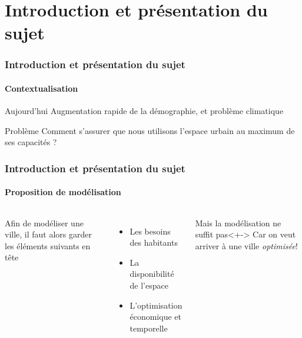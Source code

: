 \section[Intro]{Introduction et présentation du sujet}

\begin{frame}
	\frametitle{Introduction et présentation du sujet}
	\framesubtitle{Contextualisation}

	\begin{block}{Aujourd'hui}
		Augmentation rapide de la démographie, et problème climatique
	\end{block}

	\pause

	\begin{alertblock}{Problème}
		\pause
		Comment s'assurer que nous utilisons l'espace urbain au maximum de ses capacités ?
	\end{alertblock}

\end{frame}


\begin{frame}
	\frametitle{Introduction et présentation du sujet}
	\framesubtitle{Proposition de modélisation}

	\begin{columns}
			Afin de modéliser une ville, il faut alors garder les éléments suivants en tête

			\pause

			\begin{itemize}[<+->]
				\item		Les besoins des habitants
				\item		La disponibilité de l'espace
				\item		L'optimisation économique et temporelle

			\end{itemize}



			\begin{alertblock}{Mais la modélisation ne suffit pas}<+->
				Car on veut arriver à une ville \textit{optimisée}!
			\end{alertblock}

	\end{columns}

\end{frame}

